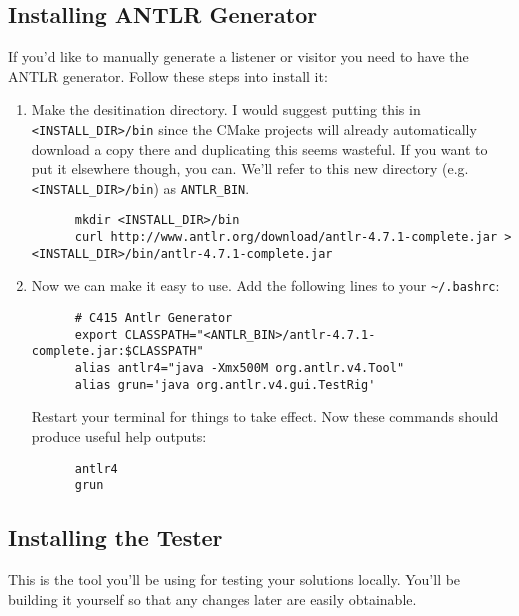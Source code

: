 \documentclass[../setup.tex]{subfiles}
\begin{document}
\subsection{Installing ANTLR Generator}
If you'd like to manually generate a listener or visitor you need to have the ANTLR generator.
Follow these steps into install it:
\begin{enumerate}
  \item
    Make the desitination directory. I would suggest putting this in \lstinline{<INSTALL_DIR>/bin}
    since the CMake projects will already automatically download a copy there and duplicating
    this seems wasteful. If you want to put it elsewhere though, you can. We'll refer to this new
    directory (e.g. \lstinline{<INSTALL_DIR>/bin}) as \lstinline{ANTLR_BIN}.
    \begin{lstlisting}
      mkdir <INSTALL_DIR>/bin
      curl http://www.antlr.org/download/antlr-4.7.1-complete.jar > <INSTALL_DIR>/bin/antlr-4.7.1-complete.jar
    \end{lstlisting}
  \item
    Now we can make it easy to use. Add the following lines to your \lstinline{~/.bashrc}:
    \begin{lstlisting}
      # C415 Antlr Generator
      export CLASSPATH="<ANTLR_BIN>/antlr-4.7.1-complete.jar:$CLASSPATH"
      alias antlr4="java -Xmx500M org.antlr.v4.Tool"
      alias grun='java org.antlr.v4.gui.TestRig'
    \end{lstlisting}
    Restart your terminal for things to take effect. Now these commands should produce useful help
    outputs:
    \begin{lstlisting}
      antlr4
      grun
    \end{lstlisting}
\end{enumerate}

\subsection{Installing the Tester}
This is the tool you'll be using for testing your solutions locally. You'll be building it yourself
so that any changes later are easily obtainable.
\end{document}

